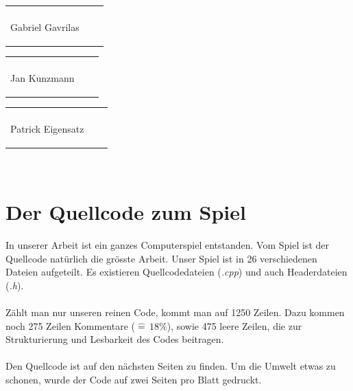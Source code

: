 \documentclass[11pt,a4paper]{scrbook}
\begin{document}
\vspace{1 cm}
\begin{tabular}{p{5cm}p{.5cm}l}
\dotfill \\
\begin{center}
Gabriel Gavrilas

\end{center}\end{tabular}%
\hfill
\begin{tabular}{p{5cm}p{.5cm}l}
\dotfill \\
\begin{center}
Jan Kunzmann

\end{center}\end{tabular}%
\hfill
\begin{tabular}{p{5cm}p{.5cm}l}
\dotfill \\
\begin{center}
Patrick Eigensatz
\end{center}
\end{tabular}%
\\

\chapter*{Der Quellcode zum Spiel}
In unserer Arbeit ist ein ganzes Computerspiel entstanden. Vom Spiel ist der Quellcode natürlich die grösste Arbeit.
Unser Spiel ist in 26 verschiedenen Dateien aufgeteilt. Es existieren Quellcodedateien (\textit{.cpp}) und auch Headerdateien (\textit{.h}).\\
\\
Zählt man nur unseren reinen Code, kommt man auf 1250 Zeilen. Dazu kommen noch 275
Zeilen Kommentare ($\widehat{=}\,18\%$), sowie 475 leere Zeilen, die zur Strukturierung und Lesbarkeit des Codes beitragen.\\
\\
Den Quellcode ist auf den nächsten Seiten zu finden. Um die Umwelt etwas zu schonen, wurde der Code auf zwei Seiten pro Blatt gedruckt.
\end{document}
